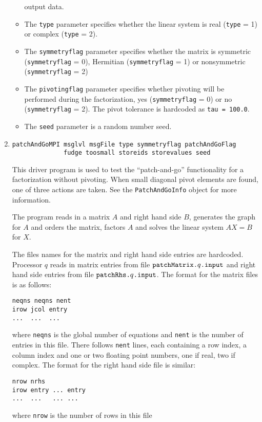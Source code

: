 \begin{enumerate}
\begin{itemize}
output data.
\item
The {\tt type} parameter specifies whether the linear system is
real ({\tt type} = 1) or complex ({\tt type} = 2).
\item
The {\tt symmetryflag} parameter specifies whether the matrix is
symmetric ({\tt symmetryflag} = 0),
Hermitian ({\tt symmetryflag} = 1) or
nonsymmetric ({\tt symmetryflag} = 2)
\item
The {\tt pivotingflag} parameter specifies whether pivoting will be
performed during the factorization,
yes ({\tt symmetryflag} = 0) or
no ({\tt symmetryflag} = 2).
The pivot tolerance is hardcoded as {\tt tau = 100.0}.
\item
The {\tt seed} parameter is a random number seed.
\end{itemize}
\item
\begin{verbatim}
patchAndGoMPI msglvl msgFile type symmetryflag patchAndGoFlag 
              fudge toosmall storeids storevalues seed 
\end{verbatim}
This driver program is used to test the ``patch-and-go''
functionality for a factorization without pivoting.
When small diagonal pivot elements are found, 
one of three actions are taken.
See the {\tt PatchAndGoInfo} object for more information.
\par
The program reads in a matrix $A$ and right hand side $B$,
generates the graph for $A$ and orders the matrix,
factors $A$ and solves the linear system $AX = B$ for $X$.
\par
The files names for the matrix and right hand side entries are
hardcoded.
Processor $q$ reads in matrix entries from file 
$\mbox{\tt patchMatrix.}q\mbox{\tt .input}$
and right hand side entries from file
$\mbox{\tt patchRhs.}q\mbox{\tt .input}$.
The format for the matrix files is as follows:
\begin{verbatim}
neqns neqns nent
irow jcol entry
...  ...  ...
\end{verbatim}
where {\tt neqns} is the global number of equations and {\tt nent}
is the number of entries in this file.
There follows {\tt nent} lines, each containing a row index, a
column index and one or two floating point numbers, one if real,
two if complex.
The format for the right hand side file is similar:
\begin{verbatim}
nrow nrhs
irow entry ... entry
...  ...   ... ...
\end{verbatim}
where {\tt nrow} is the number of rows in this file

\end{enumerate}
